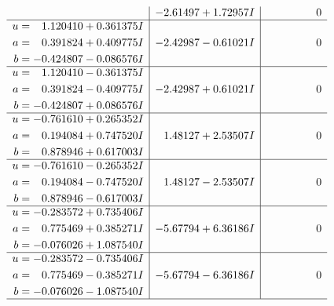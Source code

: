 \documentclass[1p]{elsarticle_modified}
\theoremstyle{definition}
\begin{document}
$$\begin{array}{c|c|c}
 & -2.61497 + 1.72957 I & \phantom{-0.000000 } 0 \\ \hline\begin{aligned}
u &= \phantom{-}1.120410 + 0.361375 I \\
a &= \phantom{-}0.391824 + 0.409775 I \\
b &= -0.424807 - 0.086576 I\end{aligned}
 & -2.42987 - 0.61021 I & \phantom{-0.000000 } 0 \\ \hline\begin{aligned}
u &= \phantom{-}1.120410 - 0.361375 I \\
a &= \phantom{-}0.391824 - 0.409775 I \\
b &= -0.424807 + 0.086576 I\end{aligned}
 & -2.42987 + 0.61021 I & \phantom{-0.000000 } 0 \\ \hline\begin{aligned}
u &= -0.761610 + 0.265352 I \\
a &= \phantom{-}0.194084 + 0.747520 I \\
b &= \phantom{-}0.878946 + 0.617003 I\end{aligned}
 & \phantom{-}1.48127 + 2.53507 I & \phantom{-0.000000 } 0 \\ \hline\begin{aligned}
u &= -0.761610 - 0.265352 I \\
a &= \phantom{-}0.194084 - 0.747520 I \\
b &= \phantom{-}0.878946 - 0.617003 I\end{aligned}
 & \phantom{-}1.48127 - 2.53507 I & \phantom{-0.000000 } 0 \\ \hline\begin{aligned}
u &= -0.283572 + 0.735406 I \\
a &= \phantom{-}0.775469 + 0.385271 I \\
b &= -0.076026 + 1.087540 I\end{aligned}
 & -5.67794 + 6.36186 I & \phantom{-0.000000 } 0 \\ \hline\begin{aligned}
u &= -0.283572 - 0.735406 I \\
a &= \phantom{-}0.775469 - 0.385271 I \\
b &= -0.076026 - 1.087540 I\end{aligned}
 & -5.67794 - 6.36186 I & \phantom{-0.000000 } 0\\
 \hline 
 \end{array}$$\newpage$$\begin{array}{c|c|c}  

\end{array}$$
\end{document}
